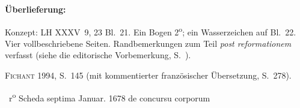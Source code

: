 %
%
%
%
%
\frenchspacing%
%
\begin{ledgroupsized}[r]{120mm}%
\footnotesize%
\pstart%
\noindent%
\textbf{Überlieferung:}%
\pend%
\end{ledgroupsized}%
\begin{ledgroupsized}[r]{114mm}%
\footnotesize%
\pstart%
\parindent -6mm%
%
Konzept:
LH XXXV~9, 23 Bl.~21.
Ein Bogen 2\textsuperscript{o};
ein Wasserzeichen auf Bl.~22.
Vier vollbeschriebene Seiten.
Randbemerkungen zum Teil \textit{post reformationem} verfasst (siehe die editorische Vorbemerkung, S.~).
\pend%
\end{ledgroupsized}%
%
\begin{ledgroupsized}[r]{114mm}%
\footnotesize%
\pstart%
\parindent -6mm%
%
\textsc{Fichant} 1994, S.~145\cite{01056}
(mit kommentierter französischer Übersetzung, S.~278).
\pend%
\end{ledgroupsized}%
%
%
\frenchspacing%
%
%
\vspace{8mm}%
\count{}%
\count{}%
\count{}
\normalsize%
\pstart%
\noindent%
%
~r\textsuperscript{o}\rbrack%
\hspace{45mm}
Scheda septima%
\protect{}%
\hspace{35mm}
Januar. 1678%
\pend%
%
\pstart%
\noindent%
\centering%
de concursu corporum%
\protect{}%
\pend%
\vspace{0.5em}%
%
\pstart%
\noindent%
